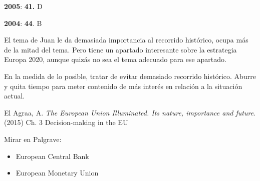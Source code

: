 \documentclass{nuevotema}
\begin{document}
\textbf{2005}: \textbf{41.} D

\textbf{2004}: \textbf{44}. B



El tema de Juan le da demasiada importancia al recorrido histórico, ocupa más de la mitad del tema. Pero tiene un apartado interesante sobre la estrategia Europa 2020, aunque quizás no sea el tema adecuado para ese apartado.

En la medida de lo posible, tratar de evitar demasiado recorrido histórico. Aburre y quita tiempo para meter contenido de más interés en relación a la situación actual.


\bibliografia

El Agraa, A. \textit{The European Union Illuminated. Its nature, importance and future}. (2015) Ch. 3 Decision-making in the EU

Mirar en Palgrave:
\begin{itemize}
	\item European Central Bank
	\item European Monetary Union
\end{itemize}
\end{document}
